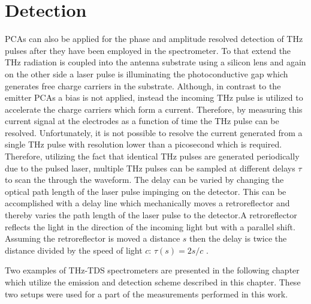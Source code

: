 \section{Detection}
\label{sec:thz-detection}
PCAs can also be applied for the phase and amplitude resolved detection of THz pulses after they have been employed in the spectrometer. To that extend the THz radiation is coupled into the antenna substrate using a silicon lens and again on the other side a laser pulse is illuminating the photoconductive gap which generates free charge carriers in the substrate. Although, in contrast to the emitter PCAs a bias is not applied, instead the incoming THz pulse is utilized to accelerate the charge carriers which form a current. Therefore, by measuring this current signal at the electrodes as a function of time the THz pulse can be resolved. Unfortunately, it is not possible to resolve the current generated from a single THz pulse with resolution lower than a picosecond which is required. Therefore, utilizing the fact that identical THz pulses are generated periodically due to the pulsed laser, multiple THz pulses can be sampled at different delays $\tau$ to scan the through the waveform. The delay can be varied by changing the optical path length of the laser pulse impinging on the detector. This can be accomplished with a delay line which mechanically moves a retroreflector and thereby varies the path length of the laser pulse to the detector.A retroreflector reflects the light in the direction of the incoming light but with a parallel shift. Assuming the retroreflector is moved a distance $s$ then the delay is twice the distance divided by the speed of light $c$: $\tau(s) = 2s/c$ \cite{Rutz2007}. 

Two examples of THz-TDS spectrometers are presented in the following chapter which utilize the emission and detection scheme described in this chapter. These two setups were used for a part of the measurements performed in this work. 